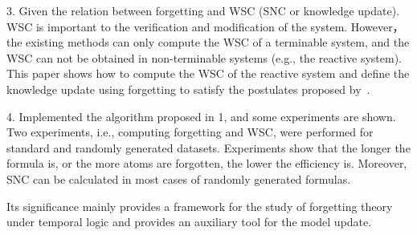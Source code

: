 \begin{englishabstract}
3. Given the relation between forgetting and WSC (SNC or knowledge update). WSC is important to the verification and modification of the system. However， the existing methods can only compute the WSC of a terminable system, and the WSC can not be obtained in non-terminable systems (e.g., the reactive system). This paper shows how to compute the WSC of the reactive system and define the knowledge update using forgetting to satisfy the postulates proposed by~\citeauthor{katsuno91mendelzon}.

4.  Implemented the algorithm proposed in 1, and some experiments are shown. Two experiments,  i.e., computing forgetting and WSC, were performed for standard and randomly generated datasets. Experiments show that the longer the formula is, or the more atoms are forgotten, the lower the efficiency is. Moreover, SNC can be calculated in most cases of randomly generated formulas.

Its significance mainly provides a framework for the study of forgetting theory under temporal logic and provides an auxiliary tool for the model update.





\end{englishabstract}
